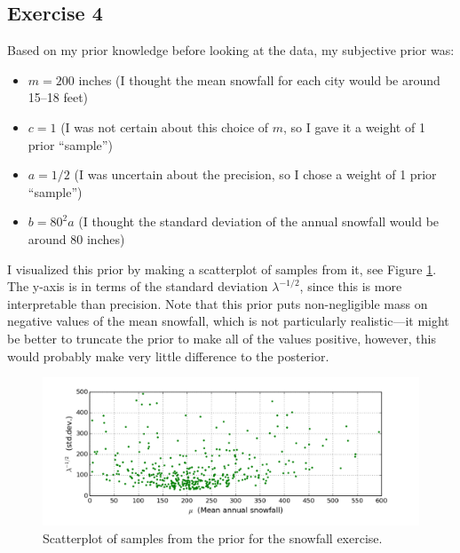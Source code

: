\documentclass[12pt]{article}
\begin{document}
\subsection*{Exercise 4}
Based on my prior knowledge before looking at the data, my subjective prior was:
\begin{itemize}
\item $m = 200$ inches (I thought the mean snowfall for each city would be around 15--18 feet)
\item $c = 1$ (I was not certain about this choice of $m$, so I gave it a weight of 1 prior ``sample'')
\item $a = 1/2$ (I was uncertain about the precision, so I chose a weight of 1 prior ``sample'')
\item $b = 80^2 a$ (I thought the standard deviation of the annual snowfall would be around 80 inches)
\end{itemize}
I visualized this prior by making a scatterplot of samples from it, see Figure \ref{figure:snow-prior}. The y-axis is in terms of the standard deviation $\lambda^{-1/2}$, since this is more interpretable than precision. Note that this prior puts non-negligible mass on negative values of the mean snowfall, which is not particularly realistic---it might be better to truncate the prior to make all of the values positive, however, this would probably make very little difference to the posterior. 

\begin{figure}
  \begin{center}
    \includegraphics[width=1\textwidth]{code/snow-prior-1.png}
  \end{center}
  \caption{Scatterplot of samples from the prior for the snowfall exercise.}
  \label{figure:snow-prior}
\end{figure}
\end{document}
